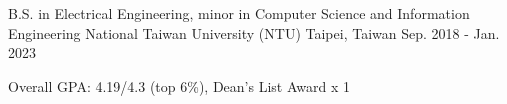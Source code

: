

\begin{cventries}

  \cventry
  {B.S. in Electrical Engineering, minor in Computer Science and Information Engineering} %
  {National Taiwan University (NTU)} %
  {Taipei, Taiwan} %
  {Sep. 2018 - Jan. 2023} %
  {
    \begin{cvitems} %
      \item {Overall GPA: 4.19/4.3 (top 6\%), Dean's List Award x 1}
    \end{cvitems}
  }

\end{cventries}
